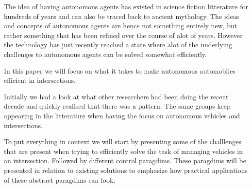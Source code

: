 The idea of having autonomous agents has existed in science fiction litterature for hundreds of years and can also be traced back to ancient mythology.
The ideas and concepts of autonomous agents are hence not something entirely new, but rather something that has been refined over the course of alot of years.
However the technology has just recently reached a state where alot of the underlying challenges to autonomous agents can be solved somewhat efficiently.

In this paper we will focus on what it takes to make autonomous automobiles efficient in intersections.

Initially we had a look at what other researchers had been doing the recent decade and quickly realised that there was a pattern. 
The same groups keep appearing in the litterature when having the focus on autonomous vehicles and intersections.

To put everything in context we will start by presenting some of the challlenges that are present when trying to efficiently solve the task of managing vehicles in an intersection.
Followed by different control paragdims. These paragdims will be presented in relation to existing solutions to emphasize how practical applications of these abstract paragdims can look.  
